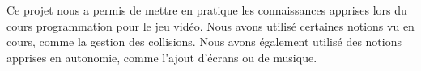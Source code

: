 Ce projet nous a permis de mettre en pratique les connaissances apprises lors du cours programmation pour le jeu vidéo. Nous avons utilisé certaines notions vu en cours, comme la gestion des collisions. Nous avons également utilisé des notions apprises en autonomie, comme l'ajout d'écrans ou de musique. 